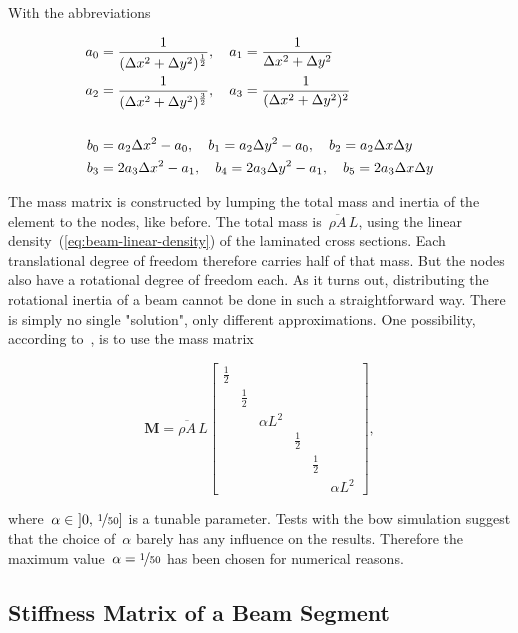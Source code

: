 With the abbreviations

\begin{align}
a_{0} &= \frac{1}{(\Delta x^2 + \Delta y^2)^{\frac{1}{2}}},\quad
a_{1}  = \frac{1}{\Delta x^2 + \Delta y^2}\notag\\
a_{2} &= \frac{1}{(\Delta x^2 + \Delta y^2)^{\frac{3}{2}}},\quad
a_{3}  = \frac{1}{(\Delta x^2 + \Delta y^2)^{2}}\\
\notag\\
b_{0} &= a_{2}\Delta x^2 - a_{0},\quad b_{1} = a_{2}\Delta y^2 - a_{0},\quad b_{2} = a_{2}\Delta x\Delta y\notag\\
b_{3} &= 2a_{3}\Delta x^2 - a_{1},\quad b_{4} = 2a_{3}\Delta y^2 - a_{1},\quad b_{5} = 2a_{3}\Delta x\Delta y
\end{align}

The mass matrix is constructed by lumping the total mass and inertia of the element to the nodes, like before.
The total mass is~$\overline{\rho A}\,L$, using the linear density~(\ref{eq:beam-linear-density}) of the laminated cross sections.
Each translational degree of freedom therefore carries half of that mass. But the nodes also have a rotational degree of freedom each.
As it turns out, distributing the rotational inertia of a beam cannot be done in such a straightforward way.
There is simply no single "solution", only different approximations.
One possibility, according to~\cite{bib:beam_element_2}, is to use the mass matrix

\begin{equation}
\boldsymbol{M} = 
\overline{\rho A}\,L
\begin{bmatrix}
\frac{1}{2}\\
& \frac{1}{2}\\
&& \alpha L^2\\
&&& \frac{1}{2}\\
&&&& \frac{1}{2}\\
&&&&& \alpha L^2
\end{bmatrix},
\end{equation}

where~$\alpha \in\ ]0,\,\nicefrac{1}{50}]$ is a tunable parameter. Tests with the bow simulation suggest that the choice of~$\alpha$ barely has any influence on the results. Therefore the maximum value~$\alpha = \nicefrac{1}{50}$ has been chosen for numerical reasons.

\newpage
\subsection{Stiffness Matrix of a Beam Segment}

